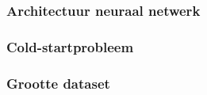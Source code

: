\subsubsection{Architectuur neuraal netwerk}

\subsubsection{Cold-startprobleem}

\subsubsection{Grootte dataset}
